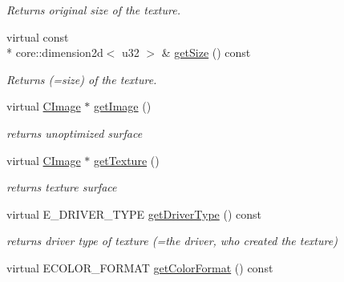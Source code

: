 \begin{DoxyCompactItemize}
\begin{DoxyCompactList}\small\item\em Returns original size of the texture. \end{DoxyCompactList}\item 
\hypertarget{classirr_1_1video_1_1_c_software_texture_a0e8330692cbe2f8c68a757b708712600}{virtual const \\*
core\-::dimension2d$<$ u32 $>$ \& \hyperlink{classirr_1_1video_1_1_c_software_texture_a0e8330692cbe2f8c68a757b708712600}{get\-Size} () const }\label{classirr_1_1video_1_1_c_software_texture_a0e8330692cbe2f8c68a757b708712600}

\begin{DoxyCompactList}\small\item\em Returns (=size) of the texture. \end{DoxyCompactList}\item 
\hypertarget{classirr_1_1video_1_1_c_software_texture_afdc0b2459d1f8e83ed3775bc97dac26f}{virtual \hyperlink{classirr_1_1video_1_1_c_image}{C\-Image} $\ast$ \hyperlink{classirr_1_1video_1_1_c_software_texture_afdc0b2459d1f8e83ed3775bc97dac26f}{get\-Image} ()}\label{classirr_1_1video_1_1_c_software_texture_afdc0b2459d1f8e83ed3775bc97dac26f}

\begin{DoxyCompactList}\small\item\em returns unoptimized surface \end{DoxyCompactList}\item 
\hypertarget{classirr_1_1video_1_1_c_software_texture_aa9c4ee01965f124569b64361d545586a}{virtual \hyperlink{classirr_1_1video_1_1_c_image}{C\-Image} $\ast$ \hyperlink{classirr_1_1video_1_1_c_software_texture_aa9c4ee01965f124569b64361d545586a}{get\-Texture} ()}\label{classirr_1_1video_1_1_c_software_texture_aa9c4ee01965f124569b64361d545586a}

\begin{DoxyCompactList}\small\item\em returns texture surface \end{DoxyCompactList}\item 
\hypertarget{classirr_1_1video_1_1_c_software_texture_aa4f4b3c107f534d057550f43aaca1535}{virtual E\-\_\-\-D\-R\-I\-V\-E\-R\-\_\-\-T\-Y\-P\-E \hyperlink{classirr_1_1video_1_1_c_software_texture_aa4f4b3c107f534d057550f43aaca1535}{get\-Driver\-Type} () const }\label{classirr_1_1video_1_1_c_software_texture_aa4f4b3c107f534d057550f43aaca1535}

\begin{DoxyCompactList}\small\item\em returns driver type of texture (=the driver, who created the texture) \end{DoxyCompactList}\item 
\hypertarget{classirr_1_1video_1_1_c_software_texture_a4820e9a746ab196cd6c7028b84d6f384}{virtual E\-C\-O\-L\-O\-R\-\_\-\-F\-O\-R\-M\-A\-T \hyperlink{classirr_1_1video_1_1_c_software_texture_a4820e9a746ab196cd6c7028b84d6f384}{get\-Color\-Format} () const }\label{classirr_1_1video_1_1_c_software_texture_a4820e9a746ab196cd6c7028b84d6f384}


\end{DoxyCompactItemize}
